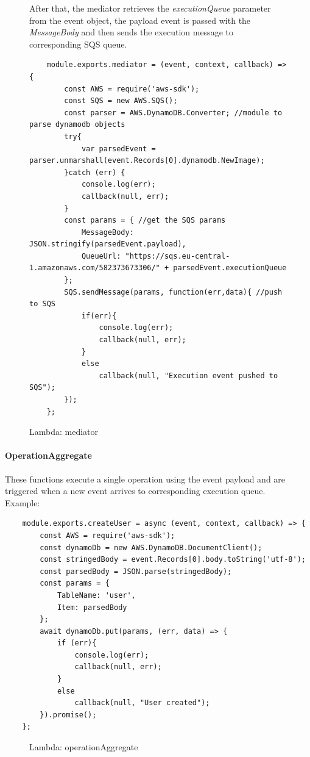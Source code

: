 \begin{figure} [H]

After that, the mediator retrieves the \emph{executionQueue} parameter from the event object, the payload event is passed with the \emph{MessageBody} and then sends the execution message to corresponding SQS queue. 
\begin{lstlisting}
	module.exports.mediator = (event, context, callback) => { 
		const AWS = require('aws-sdk');
		const SQS = new AWS.SQS();
		const parser = AWS.DynamoDB.Converter; //module to parse dynamodb objects
		try{
			var parsedEvent = parser.unmarshall(event.Records[0].dynamodb.NewImage); 
		}catch (err) {
			console.log(err);
			callback(null, err);
		}
		const params = { //get the SQS params 
			MessageBody: JSON.stringify(parsedEvent.payload),
			QueueUrl: "https://sqs.eu-central-1.amazonaws.com/582373673306/" + parsedEvent.executionQueue
		};
		SQS.sendMessage(params, function(err,data){ //push to SQS
			if(err){
				console.log(err);
				callback(null, err);
			}
			else
				callback(null, "Execution event pushed to SQS");
		});
	};
\end{lstlisting}
	\caption{Lambda: mediator}
\end{figure}


\paragraph{OperationAggregate} \Spazio
These functions execute a single operation using the event payload and are triggered when a new event arrives to corresponding execution queue.\\
Example:
\begin{lstlisting}
	module.exports.createUser = async (event, context, callback) => {
		const AWS = require('aws-sdk');
		const dynamoDb = new AWS.DynamoDB.DocumentClient();
		const stringedBody = event.Records[0].body.toString('utf-8');
		const parsedBody = JSON.parse(stringedBody);
		const params = {
			TableName: 'user',
			Item: parsedBody
		};
		await dynamoDb.put(params, (err, data) => {
			if (err){
				console.log(err);
				callback(null, err);
			}
			else
				callback(null, "User created");
		}).promise();
	};
\end{lstlisting}
\begin{figure} [H]
	\caption{Lambda: operationAggregate}
\end{figure}

